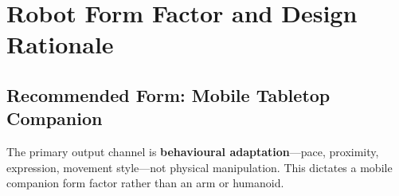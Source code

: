 \documentclass[11pt,a4paper]{article}
\begin{document}
\section{Robot Form Factor and Design Rationale}
\label{sec:form-factor}

\subsection{Recommended Form: Mobile Tabletop Companion}

The primary output channel is \textbf{behavioural adaptation}---pace, proximity, expression, movement style---not physical manipulation. This dictates a mobile companion form factor rather than an arm or humanoid.
\end{document}

